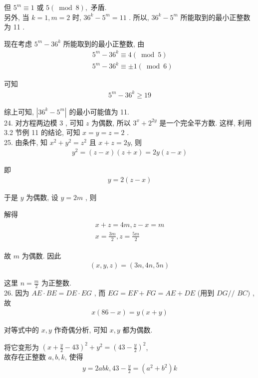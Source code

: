 但 $5^{m} \equiv 1$ 或 $5(\bmod 8) , $ 矛盾.\\
另外, 当 $k=1, m=2$ 时,  $36^{k}-5^{m}=11$ . 所以,  $36^{k}-5^{m}$ 所能取到的最小正整数为 11 .

现在考虑 $5^{m}-36^{k}$ 所能取到的最小正整数, 由\begin{align}
	 & 5^{m}-36^{k} \equiv 4(\bmod 5)     \\
	 & 5^{m}-36^{k} \equiv \pm 1(\bmod 6)
\end{align}

可知
\begin{align*}
	5^{m}-36^{k} \geqslant 19
\end{align*}

综上可知,  $\left|36^{k}-5^{m}\right|$ 的最小可能值为 11.\\
24. 对方程两边模 3 , 可知 $z$ 为偶数, 所以 $3^{x}+2^{2 y}$ 是一个完全平方数. 这样, 利用 3.2 节例 11 的结论, 可知 $x=y=z=2$ . \\
25. 由条件, 知 $x^{2}+y^{2}=z^{2}$ 且 $x+z=2 y$, 则
\begin{align*}
	y^{2}=(z-x)(z+x)=2 y(z-x)
\end{align*}

即
\begin{align*}
	y=2(z-x)
\end{align*}

于是 $y$ 为偶数, 设 $y=2 m$ , 则

解得
\begin{align*}
	\begin{gathered}
		x+z=4 m, z-x=m \\
		x=\frac{3 m}{2}, z=\frac{5 m}{2}
	\end{gathered}
\end{align*}

故 $m$ 为偶数. 因此
\begin{align*}
	(x, y, z)=(3 n, 4 n, 5 n)
\end{align*}

这里 $n=\frac{m}{2}$ 为正整数.\\
26. 因为 $A E \cdot B E=D E \cdot E G$ , 而 $E G=E F+F G=A E+D E$ (用到 $D G / /$ $B C)$ , 故
\begin{align*}
	x(86-x)=y(x+y)
\end{align*}

对等式中的 $x ,  y$ 作奇偶分析, 可知 $x ,  y$ 都为偶数.

将它变形为 $\left(x+\frac{y}{2}-43\right)^{2}+y^{2}=\left(43-\frac{y}{2}\right)^{2}$,\\
故存在正整数 $a ,  b ,  k$, 使得
\begin{align*}
	y=2 a b k, 43-\frac{y}{2}=\left(a^{2}+b^{2}\right) k
\end{align*}

